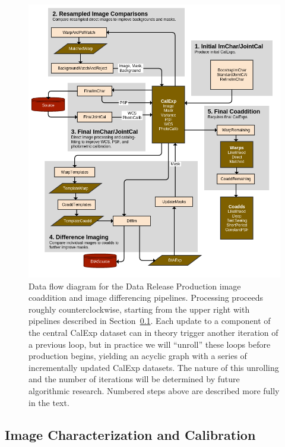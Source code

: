 \begin{figure}
\centering
\includegraphics[width=\textwidth]{figures/drp_coaddition_and_diffim.png}
\caption{
  Data flow diagram for the Data Release Production image coaddition and image differencing pipelines.  Processing proceeds roughly counterclockwise, starting from the upper right with pipelines described in Section~\ref{sec:drp_imchar_and_jointcal}.  Each update to a component of the central CalExp dataset can in theory trigger another iteration of a previous loop, but in practice we will ``unroll'' these loops before production begins, yielding an acyclic graph with a series of incrementally updated CalExp datasets.  The nature of this unrolling and the number of iterations will be determined by future algorithmic research.  Numbered steps above are described more fully in the text.
  \label{fig:drp_coaddition_and_diffim}
}
\end{figure}


\subsection{Image Characterization and Calibration}
\label{sec:drp_imchar_and_jointcal}

